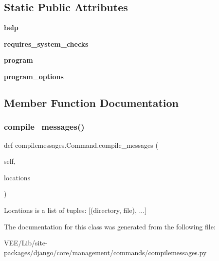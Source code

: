 \subsection*{Static Public Attributes}
\begin{DoxyCompactItemize}
\item 
\mbox{\label{classcompilemessages_1_1_command_a0fa213a454514e84363d294186ef713a}} 
{\bfseries help}
\item 
\mbox{\label{classcompilemessages_1_1_command_ae4f557fbb06f3123e0fbd77a9d127c3c}} 
{\bfseries requires\+\_\+system\+\_\+checks}
\item 
\mbox{\label{classcompilemessages_1_1_command_ace7f8a9423d73e1dd4d7e2bc1022e196}} 
{\bfseries program}
\item 
\mbox{\label{classcompilemessages_1_1_command_ab648e510d63e92a5f2db3a5f7ca7cee1}} 
{\bfseries program\+\_\+options}
\end{DoxyCompactItemize}


\subsection{Member Function Documentation}
\mbox{\label{classcompilemessages_1_1_command_ac5890ffaba81b8c72b4634c0b0e49328}} 
\subsubsection{\texorpdfstring{compile\+\_\+messages()}{compile\_messages()}}
{\footnotesize\ttfamily def compilemessages.\+Command.\+compile\+\_\+messages (\begin{DoxyParamCaption}\item[{}]{self,  }\item[{}]{locations }\end{DoxyParamCaption})}

\begin{DoxyVerb}Locations is a list of tuples: [(directory, file), ...]
\end{DoxyVerb}
 

The documentation for this class was generated from the following file\+:\begin{DoxyCompactItemize}
\item 
V\+E\+E/\+Lib/site-\/packages/django/core/management/commands/compilemessages.\+py\end{DoxyCompactItemize}
